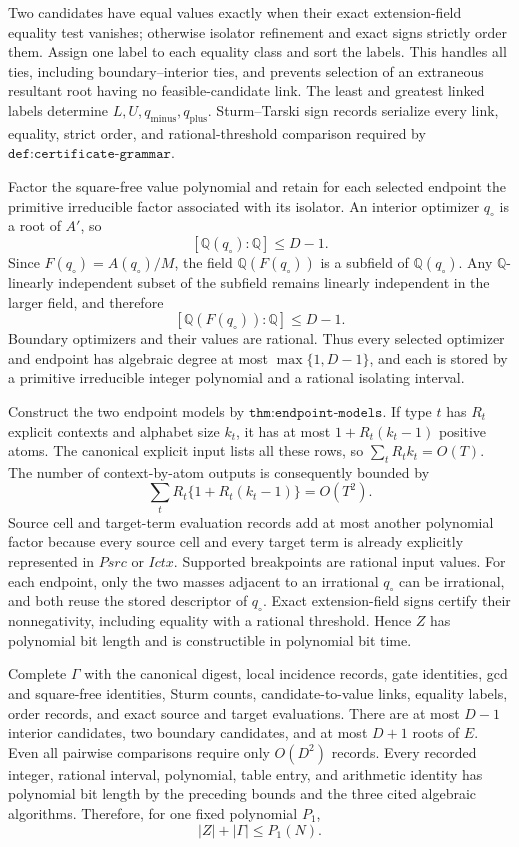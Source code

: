 Two candidates have equal values exactly when their exact extension-field equality test vanishes; otherwise isolator refinement and exact signs strictly order them.  Assign one label to each equality class and sort the labels.  This handles all ties, including boundary--interior ties, and prevents selection of an extraneous resultant root having no feasible-candidate link.  The least and greatest linked labels determine \(L,U,q_{\mathrm{minus}},q_{\mathrm{plus}}\).  Sturm--Tarski sign records serialize every link, equality, strict order, and rational-threshold comparison required by \(\texttt{def:certificate-grammar}\).

Factor the square-free value polynomial and retain for each selected endpoint the primitive irreducible factor associated with its isolator.  An interior optimizer \(q_\circ\) is a root of \(A'\), so
\[
 [\mathbb Q(q_\circ):\mathbb Q]\leq D-1.
\]
Since \(F(q_\circ)=A(q_\circ)/M\), the field \(\mathbb Q(F(q_\circ))\) is a subfield of \(\mathbb Q(q_\circ)\).  Any \(\mathbb Q\)-linearly independent subset of the subfield remains linearly independent in the larger field, and therefore
\[
 [\mathbb Q(F(q_\circ)):\mathbb Q]\leq D-1.
\]
Boundary optimizers and their values are rational.  Thus every selected optimizer and endpoint has algebraic degree at most \(\max\{1,D-1\}\), and each is stored by a primitive irreducible integer polynomial and a rational isolating interval.

Construct the two endpoint models by \(\texttt{thm:endpoint-models}\).  If type \(t\) has \(R_t\) explicit contexts and alphabet size \(k_t\), it has at most \(1+R_t(k_t-1)\) positive atoms.  The canonical explicit input lists all these rows, so \(\sum_tR_tk_t=O(T)\).  The number of context-by-atom outputs is consequently bounded by
\[
 \sum_t R_t\{1+R_t(k_t-1)\}=O(T^2).
\]
Source cell and target-term evaluation records add at most another polynomial factor because every source cell and every target term is already explicitly represented in \(Psrc\) or \(Ictx\).  Supported breakpoints are rational input values.  For each endpoint, only the two masses adjacent to an irrational \(q_\circ\) can be irrational, and both reuse the stored descriptor of \(q_\circ\).  Exact extension-field signs certify their nonnegativity, including equality with a rational threshold.  Hence \(Z\) has polynomial bit length and is constructible in polynomial bit time.

Complete \(\Gamma\) with the canonical digest, local incidence records, gate identities, gcd and square-free identities, Sturm counts, candidate-to-value links, equality labels, order records, and exact source and target evaluations.  There are at most \(D-1\) interior candidates, two boundary candidates, and at most \(D+1\) roots of \(E\).  Even all pairwise comparisons require only \(O(D^2)\) records.  Every recorded integer, rational interval, polynomial, table entry, and arithmetic identity has polynomial bit length by the preceding bounds and the three cited algebraic algorithms.  Therefore, for one fixed polynomial \(P_1\),
\[
 |Z|+|\Gamma|\leq P_1(N).
\]


